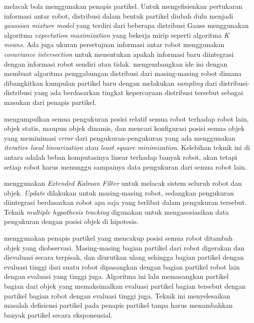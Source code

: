 \citet{santos2009} melacak bola menggunakan penapis partikel. Untuk mengefisienkan pertukaran informasi antar robot, distribusi dalam bentuk partikel diubah dulu menjadi \textit{gaussian mixture model} yang terdiri dari beberapa distribusi Gauss menggunakan algoritma \textit{expectation maximization} yang bekerja mirip seperti algoritma \textit{K means}. Ada juga ukuran persetujuan informasi antar robot menggunakan \textit{covariance intersection} untuk menentukan apakah informasi baru diintegrasi dengan informasi robot sendiri atau tidak. \citet{ahmad2011} mengembangkan ide ini dengan membuat algoritma penggabungan distribusi dari masing-masing robot dimana dibangkitkan kumpulan partikel baru dengan melakukan \textit{sampling} dari distribusi-distribusi yang ada berdasarkan tingkat kepercayaan distribusi tersebut sebagai masukan dari penapis partikel.

\citet{ahmad2013} mengumpulkan semua pengukuran posisi relatif semua robot terhadap robot lain, objek statis, maupun objek dinamis, dan mencari konfigurasi posisi semua objek yang meminimasi \textit{error} dari pengukuran-pengukuran yang ada menggunakan \textit{iterative local linearization} atau \textit{least square minimization}. Kelebihan teknik ini di antara adalah beban komputasinya linear terhadap banyak robot, akan tetapi setiap robot harus menunggu sampainya data pengukuran dari semua robot lain.

\citet{chang2016} menggunakan \textit{Extended Kalman Filter} untuk melacak sistem seluruh robot dan objek. \textit{Update} dilakukan untuk masing-masing robot, sedangkan pengukuran diintegrasi berdasarkan robot apa saja yang terlibat dalam pengukuran tersebut. Teknik \textit{multiple hypothesis tracking} digunakan untuk mengasosiasikan data pengukuran dengan posisi objek di hipotesis.

\citet{ahmad2017} menggunakan penapis partikel yang mencakup posisi semua robot ditambah objek yang diobservasi. Masing-masing bagian partikel dari robot digerakan dan dievaluasi secara terpisah, dan diurutkan ulang sehingga bagian partikel dengan evaluasi tinggi dari suatu robot dipasangkan dengan bagian partikel robot lain dengan evaluasi yang tinggi juga. Algoritma ini lalu memasangkan partikel bagian dari objek yang memaksimalkan evaluasi partikel bagian tersebut dengan partikel bagian robot dengan evaluasi tinggi juga. Teknik ini menyelesaikan masalah defisiensi partikel pada penapis partikel tanpa harus menambahkan banyak partikel secara eksponensial.
